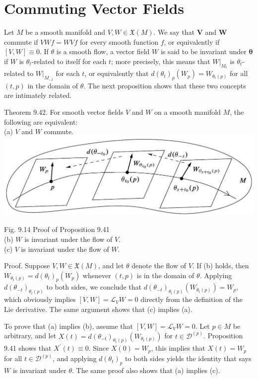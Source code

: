 \documentclass[10pt]{article}
\begin{document}
\section*{Commuting Vector Fields}
Let $M$ be a smooth manifold and $V, W \in \mathfrak{X}(M)$. We say that $\boldsymbol{V}$ and $\boldsymbol{W}$ commute if $V W f=W V f$ for every smooth function $f$, or equivalently if $[V, W] \equiv 0$. If $\theta$ is a smooth flow, a vector field $W$ is said to be invariant under $\boldsymbol{\theta}$ if $W$ is $\theta_{t}$-related to itself for each $t$; more precisely, this means that $\left.W\right|_{M_{t}}$ is $\theta_{t}$-related to $\left.W\right|_{M_{-t}}$ for each $t$, or equivalently that $d\left(\theta_{t}\right)_{p}\left(W_{p}\right)=W_{\theta_{t}(p)}$ for all $(t, p)$ in the domain of $\theta$. The next proposition shows that these two concepts are intimately related.

Theorem 9.42. For smooth vector fields $V$ and $W$ on a smooth manifold $M$, the following are equivalent:\\
(a) $V$ and $W$ commute.\\
\includegraphics[max width=\textwidth, center]{2025_06_03_90f64b1a1e243cccc2e0g-250}

Fig. 9.14 Proof of Proposition 9.41\\
(b) $W$ is invariant under the flow of $V$.\\
(c) $V$ is invariant under the flow of $W$.

Proof. Suppose $V, W \in \mathfrak{X}(M)$, and let $\theta$ denote the flow of $V$. If (b) holds, then $W_{\theta_{t}(p)}=d\left(\theta_{t}\right)_{p}\left(W_{p}\right)$ whenever $(t, p)$ is in the domain of $\theta$. Applying $d\left(\theta_{-t}\right)_{\theta_{t}(p)}$ to both sides, we conclude that $d\left(\theta_{-t}\right)_{\theta_{t}(p)}\left(W_{\theta_{t}(p)}\right)=W_{p}$, which obviously implies $[V, W]=\mathscr{L}_{V} W=0$ directly from the definition of the Lie derivative. The same argument shows that (c) implies (a).

To prove that (a) implies (b), assume that $[V, W]=\mathscr{L}_{V} W=0$. Let $p \in M$ be arbitrary, and let $X(t)=d\left(\theta_{-t}\right)_{\theta_{t}(p)}\left(W_{\theta_{t}(p)}\right)$ for $t \in \mathscr{D}^{(p)}$. Proposition 9.41 shows that $X^{\prime}(t) \equiv 0$. Since $X(0)=W_{p}$, this implies that $X(t)=W_{p}$ for all $t \in \mathscr{D}^{(p)}$, and applying $d\left(\theta_{t}\right)_{p}$ to both sides yields the identity that says $W$ is invariant under $\theta$. The same proof also shows that (a) implies (c).
\end{document}

